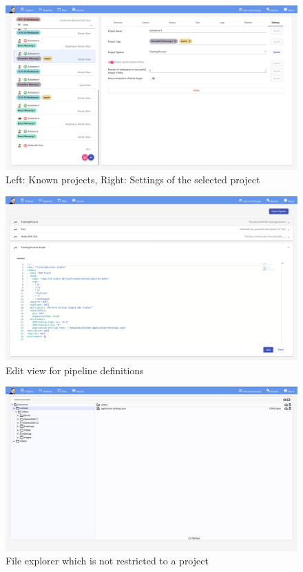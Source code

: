 \begin{figure}[H]
	\centering
	\includegraphics[width=1.0\textwidth]{screenshots/07_project_settings.png}
	\caption{Left: Known projects, Right: Settings of the selected project}
\end{figure}

\begin{figure}[H]
	\centering
	\includegraphics[width=1.0\textwidth]{screenshots/08_pipelines.png}
	\caption{Edit view for pipeline definitions}
\end{figure}

\begin{figure}[H]
	\centering
	\includegraphics[width=1.0\textwidth]{screenshots/09_files.png}
	\caption{File explorer which is not restricted to a project}
\end{figure}

